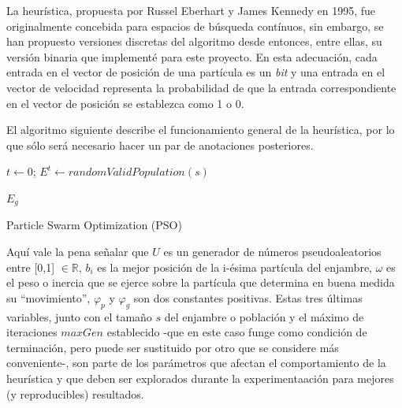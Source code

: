 \documentclass[12pt]{article}
\begin{document}
La heurística, propuesta por Russel Eberhart y James Kennedy en 1995, fue originalmente concebida para espacios de búsqueda contínuos, sin embargo, se han propuesto versiones discretas del algoritmo desde entonces, entre ellas, su versión binaria que implementé para este proyecto. En esta adecuación, cada
entrada en el vector de posición de una partícula es un \textit{bit} y una entrada en el vector
de velocidad representa la probabilidad de que la entrada correspondiente en el vector de posición
se establezca como 1 o 0.

El algoritmo siguiente describe el funcionamiento general de la heurística, por lo que sólo será necesario hacer un par de anotaciones posteriores.

\label{alg:pso}
\begin{algorithm}[H]
  $t \gets 0$;
  $E^t \gets randomValidPopulation(s)$\;
  
  \Return $E_g$

  \caption{Particle Swarm Optimization (PSO)}
\end{algorithm}

Aquí vale la pena señalar que $U$ es un generador de números pseudoaleatorios entre [0,1] $\in \mathbb{R}$,
$b_i$ es la mejor posición de la i-ésima partícula del enjambre, $\omega$ es el peso o inercia que
se ejerce sobre la partícula que determina en buena medida su ``movimiento'', $\varphi_p$ y $\varphi_g$ son dos constantes positivas. Estas tres últimas variables, junto con el tamaño $s$ del enjambre o población y el máximo de iteraciones $maxGen$ establecido -que en este caso funge como condición de terminación, pero puede ser sustituido por otro que se considere más conveniente-, son parte de los parámetros que afectan el comportamiento de la heurística y que deben ser explorados durante la experimentaación para mejores (y reproducibles) resultados.\\
\end{document}
